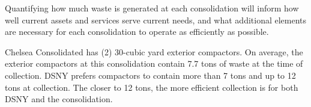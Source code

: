 
    Quantifying how much waste is generated at each consolidation will inform how well current assets and services serve current needs, and what additional elements are necessary for each consolidation to operate as efficiently as possible.
    
    Chelsea Consolidated has (2) 30-cubic yard exterior compactors. On average, the exterior compactors at this consolidation contain 7.7 tons of waste at the time of collection. DSNY prefers compactors to contain more than 7 tons and up to 12 tons at collection. The closer to 12 tons, the more efficient collection is for both DSNY and the consolidation.